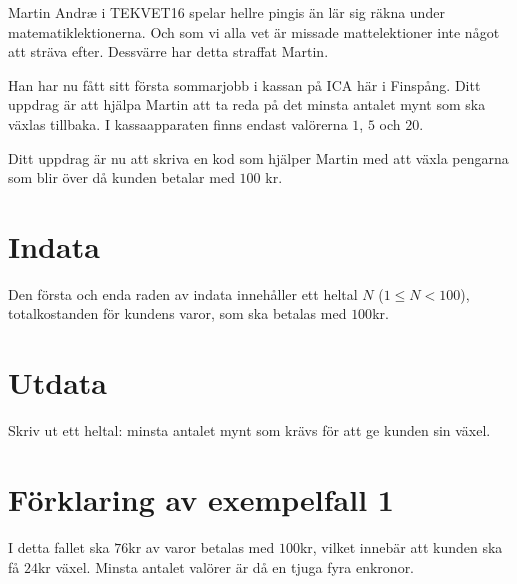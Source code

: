 Martin Andræ i TEKVET16 spelar hellre pingis än lär sig räkna under matematiklektionerna. Och som
vi alla vet är missade mattelektioner inte något att sträva efter. Dessvärre har detta straffat Martin.

Han har nu fått sitt första sommarjobb i kassan på ICA här i Finspång. Ditt uppdrag är att hjälpa Martin
att ta reda på det minsta antalet mynt som ska växlas tillbaka. I kassaapparaten finns endast valörerna
$1$, $5$ och $20$.

Ditt uppdrag är nu att skriva en kod som hjälper Martin med att växla pengarna som blir över då kunden betalar med $100$
kr.

\section*{Indata}
Den första och enda raden av indata innehåller ett heltal $N$ ($1 \leq N < 100$), totalkostanden
för kundens varor, som ska betalas med $100$kr.

\section*{Utdata}
Skriv ut ett heltal: minsta antalet mynt som krävs för att ge kunden sin växel.

\section*{Förklaring av exempelfall 1}
I detta fallet ska $76$kr av varor betalas med $100$kr, vilket innebär att kunden ska få $24$kr växel.
Minsta antalet valörer är då en tjuga fyra enkronor.
